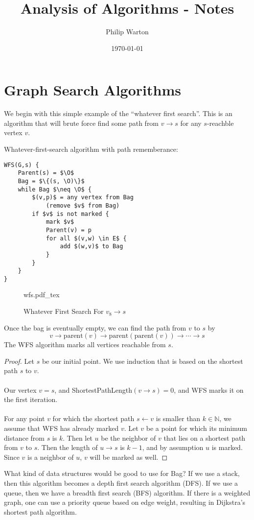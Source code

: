 \documentclass{article}
\newcommand{\incfig}[1]{%
    \def\svgwidth{\columnwidth}
    {#1.pdf_tex}
}
\theoremstyle{definition}
\begin{document}
\title{Analysis of Algorithms - Notes}
\author{Philip Warton}
\date{\today}
\maketitle
\section{Graph Search Algorithms}
We begin with this simple example of the ``whatever first search''. This is an algorithm that will brute force find some
path from $v \rightarrow s$ for any $s$-reachble vertex $v$.
\begin{mdframed}
    Whatever-first-search algorithm with path rememberance:
    \begin{lstlisting}[mathescape=true]
WFS(G,s) {
    Parent(s) = $\O$
    Bag = $\{(s, \O)\}$
    while Bag $\neq \O$ {
        $(v,p)$ = any vertex from Bag
            (remove $v$ from Bag)
        if $v$ is not marked {
            mark $v$
            Parent(v) = p
            for all $(v,w) \in E$ {
                add $(w,v)$ to Bag
            }
        }
    }
}
    \end{lstlisting}
\end{mdframed}
\begin{figure}[ht]
    \centering
    \incfig{wfs}
    \caption{Whatever First Search For $v_8 \rightarrow s$}
    \label{fig:wfs}
\end{figure}
Once the bag is eventually empty, we can find the path from 
$v$ to $s$ by
\[
    v \rightarrow \text{parent}(v) \rightarrow \text{parent}(\text{parent}(v)) \rightarrow \cdots \rightarrow s
\]
The WFS algorithm marks all vertices reachable from $s$.
\begin{proof}
    Let $s$ be our initial point. We use induction that is based on the shortest path $s$ to $v$. \\\\
     Our vertex $v = s$, and ShortestPathLength$(v\rightarrow s) = 0$, and WFS marks it on the first iteration.\\\\
     For any point $v$ for which the shortest path $s \leftarrow v$ is smaller than $k \in \mathbb{N}$,
    we assume that WFS has already marked $v$. Let $v$ be a point for which its minimum distance from $s$ is $k$.
    Then let $u$ be the neighbor of $v$ that lies on 
    a shortest path from $v$ to $s$. Then the length of $u \rightarrow s$ is $k-1$, and by assumption $u$ is marked.
    Since $v$ is a neighbor of $u$, $v$ will be marked as well.
\end{proof}
What kind of data structures would be good to use for Bag? If 
we use a stack, then this algorithm becomes a depth first search algorithm (DFS).
If we use a queue, then we have a breadth first search (BFS) algorithm.
If there is a weighted graph, one can use a priority queue based on edge weight,
resulting in Dijkstra's shortest path algorithm.
\end{document}
